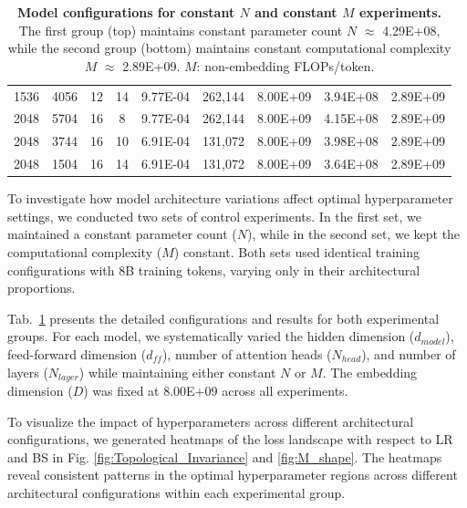 \documentclass[11pt]{article}
\begin{document}
\begin{table}
\begin{tabular}{ccccccccc}
            1536                                       & 4056  & 12   & 14   & 9.77E-04 & 262,144 & 8.00E+09 & 3.94E+08 & 2.89E+09 \\
            2048                                       & 5704  & 16   & 8    & 9.77E-04 & 262,144 & 8.00E+09 & 4.15E+08 & 2.89E+09 \\
            2048                                       & 3744  & 16   & 10   & 6.91E-04 & 131,072  & 8.00E+09 & 3.98E+08 & 2.89E+09 \\
            2048                                       & 1504  & 16   & 14   & 6.91E-04 & 131,072  & 8.00E+09 & 3.64E+08 & 2.89E+09 \\
            \hline
        \end{tabular}
        \caption{\textbf{Model configurations for constant $N$ and constant $M$ experiments.}
        The first group (top) maintains constant parameter count $N$ $\approx$ 4.29E+08,
        while the second group (bottom) maintains constant computational complexity
        $M$ $\approx$ 2.89E+09. $M$:  non-embedding FLOPs/token.}
        \label{tab:model_configs}
    \end{table}

    To investigate how model architecture variations affect optimal hyperparameter
    settings, we conducted two sets of control experiments. In the first set, we
    maintained a constant parameter count ($N$), while in the second set, we kept
    the computational complexity ($M$) constant. Both sets used identical training
    configurations with 8B training tokens, varying only in their architectural
    proportions.

    Tab.~\ref{tab:model_configs} presents the detailed configurations and
    results for both experimental groups. For each model, we systematically
    varied the hidden dimension ($d_{{model}}$), feed-forward dimension ($d_{{ff}}$), number of
    attention heads ($N_{{head}}$), and number of layers ($N_{{layer}}$) while maintaining either
    constant $N$ or $M$. The embedding dimension ($D$) was fixed at 8.00E+09 across all
    experiments.

    To visualize the impact of hyperparameters across different architectural configurations,
    we generated heatmaps of the loss landscape with respect to LR and BS in Fig. \ref{fig:Topological_Invariance} and
    \ref{fig:M_shape}. The heatmaps reveal consistent patterns in the optimal
    hyperparameter regions across different architectural configurations within
    each experimental group.
\end{document}
